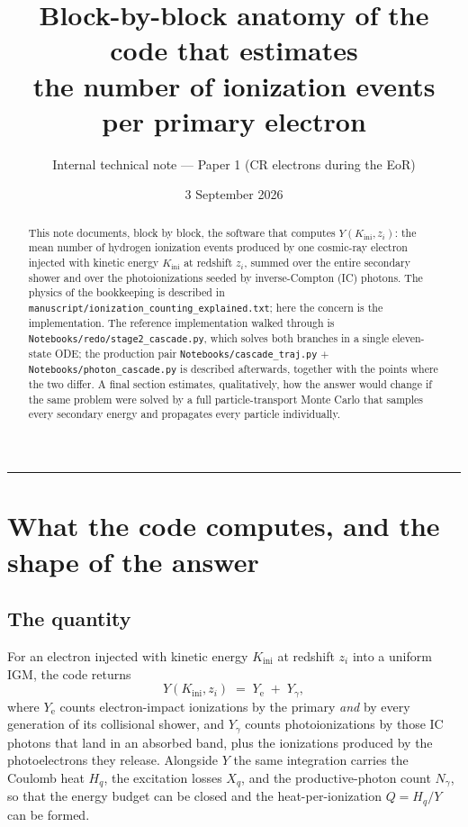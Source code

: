 \documentclass[11pt,a4paper]{article}
\title{\bfseries Block-by-block anatomy of the code that estimates\\
       the number of ionization events per primary electron}
\author{Internal technical note --- Paper 1 (CR electrons during the EoR)}
\date{3 September 2026}
\newcommand{\file}[1]{\texttt{\small #1}}
\begin{document}
\maketitle

\begin{abstract}
\noindent
This note documents, block by block, the software that computes
$Y(K_{\mathrm{ini}},z_i)$: the mean number of hydrogen ionization events
produced by one cosmic-ray electron injected with kinetic energy
$K_{\mathrm{ini}}$ at redshift $z_i$, summed over the entire secondary shower
and over the photoionizations seeded by inverse-Compton (IC) photons.  The
physics of the bookkeeping is described in
\file{manuscript/ionization\_counting\_explained.txt}; here the concern is the
implementation.  The reference implementation walked through is
\file{Notebooks/redo/stage2\_cascade.py}, which solves both branches in a
single eleven-state ODE; the production pair
\file{Notebooks/cascade\_traj.py} $+$\linebreak[1] \file{Notebooks/photon\_cascade.py} is
described afterwards, together with the points where the two differ.  A final
section estimates, qualitatively, how the answer would change if the same
problem were solved by a full particle-transport Monte Carlo that samples every
secondary energy and propagates every particle individually.
\end{abstract}

\tableofcontents
\bigskip
\hrule

\section{What the code computes, and the shape of the answer}

\subsection{The quantity}

For an electron injected with kinetic energy $K_{\mathrm{ini}}$ at redshift
$z_i$ into a uniform IGM, the code returns
\[
  Y(K_{\mathrm{ini}},z_i) \;=\; Y_{\mathrm e} \;+\; Y_\gamma ,
\]
where $Y_{\mathrm e}$ counts electron-impact ionizations by the primary
\emph{and} by every generation of its collisional shower, and $Y_\gamma$ counts
photoionizations by those IC photons that land in an absorbed band, plus the
ionizations produced by the photoelectrons they release.  Alongside $Y$ the
same integration carries the Coulomb heat $H_q$, the excitation losses $X_q$,
and the productive-photon count $N_\gamma$, so that the energy budget can be
closed and the heat-per-ionization $Q=H_q/Y$ can be formed.
\end{document}

